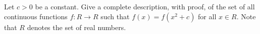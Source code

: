Let $c>0$ be a constant. Give a complete description, with proof, of
the set of all continuous functions $f: R \to R$ such that $f(x) =
f(x^2+c)$ for all $x \in R$. Note that $R$ denotes the set of real numbers.
